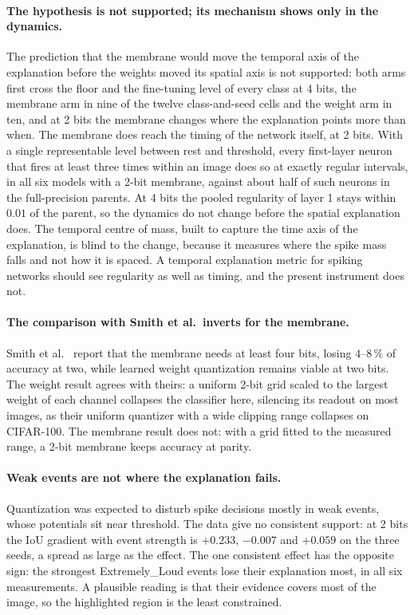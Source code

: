 \paragraph{The hypothesis is not supported; its mechanism shows only in the
dynamics.} The prediction that the membrane would move the temporal axis of the
explanation before the weights moved its spatial axis is not supported: both
arms first cross the floor and the fine-tuning level of every class at 4 bits,
the membrane arm in nine of the twelve class-and-seed cells and the weight arm in
ten, and at 2 bits the membrane
changes where the explanation points more than when. The membrane does reach the
timing of the network itself, at 2 bits. With a single representable level
between rest and threshold, every first-layer neuron that fires at least three
times within an image does so at exactly regular intervals, in all six models
with a 2-bit membrane, against about half of such neurons in the full-precision
parents. At 4 bits the pooled regularity of layer 1 stays within $0.01$ of the
parent, so the dynamics do not change before the spatial explanation does. The
temporal centre of mass, built to capture the time axis of the explanation, is
blind to the change, because it measures where the spike mass falls and not how
it is spaced. A temporal explanation metric for spiking networks should see
regularity as well as timing, and the present instrument does not.

\paragraph{The comparison with Smith et al.\ inverts for the membrane.} Smith et
al.~\cite{smith2026} report that the membrane needs at least four bits, losing
$4$--$8\,\%$ of accuracy at two, while learned weight quantization remains
viable at two bits. The weight result agrees with theirs: a uniform 2-bit grid
scaled to the largest weight of each channel collapses the classifier here,
silencing its readout on most images, as their uniform quantizer with a wide
clipping range collapses on CIFAR-100. The
membrane result does not: with a grid fitted to the measured range, a 2-bit
membrane keeps accuracy at parity.

\paragraph{Weak events are not where the explanation fails.} Quantization was
expected to disturb spike decisions mostly in weak events, whose potentials sit
near threshold. The data give no consistent support: at 2 bits the IoU gradient
with event strength is $+0.233$, $-0.007$ and $+0.059$ on the three seeds, a
spread as large as the effect. The one consistent effect has the opposite sign:
the strongest Extremely\_Loud events lose their explanation most, in all six
measurements. A plausible reading is that their evidence covers most of the
image, so the highlighted region is the least constrained.


